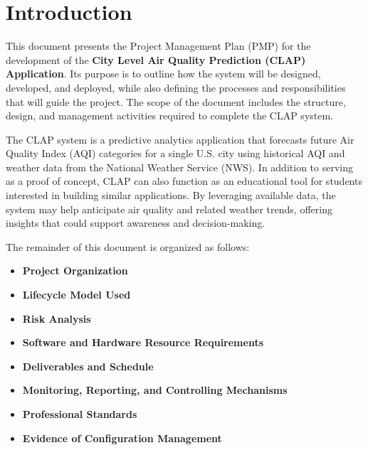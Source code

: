 \section{Introduction}

This document presents the Project Management Plan (PMP) for the development of the \textbf{City Level Air Quality Prediction (CLAP) Application}. Its purpose is to outline how the system will be designed, developed, and deployed, while also defining the processes and responsibilities that will guide the project. The scope of the document includes the structure, design, and management activities required to complete the CLAP system.

The CLAP system is a predictive analytics application that forecasts future Air Quality Index (AQI) categories for a single U.S. city using historical AQI and weather data from the National Weather Service (NWS). In addition to serving as a proof of concept, CLAP can also function as an educational tool for students interested in building similar applications. By leveraging available data, the system may help anticipate air quality and related weather trends, offering insights that could support awareness and decision-making.

The remainder of this document is organized as follows:
\begin{itemize}
    \item \textbf{Project Organization}
    \item \textbf{Lifecycle Model Used}
    \item \textbf{Risk Analysis}
    \item \textbf{Software and Hardware Resource Requirements}
    \item \textbf{Deliverables and Schedule}
    \item \textbf{Monitoring, Reporting, and Controlling Mechanisms}
    \item \textbf{Professional Standards}
    \item \textbf{Evidence of Configuration Management}
\end{itemize}